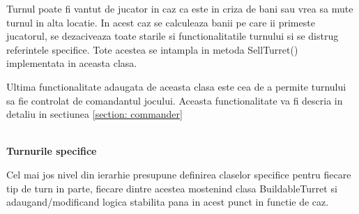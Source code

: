 \documentclass[12pt, a4paper]{article}
\begin{document}
	Turnul poate fi vantut de jucator in caz ca este in criza de bani sau vrea sa mute turnul in alta locatie. In acest caz se calculeaza banii pe care ii primeste jucatorul, se dezaciveaza toate starile si functionalitatile turnului si se distrug referintele specifice. Tote acestea se intampla in metoda SellTurret() implementata in aceasta clasa.
	\newline
	
	Ultima functionalitate adaugata de aceasta clasa este cea de a permite turnului sa fie controlat de comandantul jocului. Aceasta functionalitate va fi descria in detaliu in sectiunea \ref{section: commander} 
	
	\ \\
	\textbf{Turnurile specifice}
	
	Cel mai jos nivel din ierarhie presupune definirea claselor specifice pentru fiecare tip de turn in parte, fiecare dintre acestea mostenind clasa BuildableTurret si adaugand/modificand logica stabilita pana in acest punct in functie de caz.
	
\end{document}
